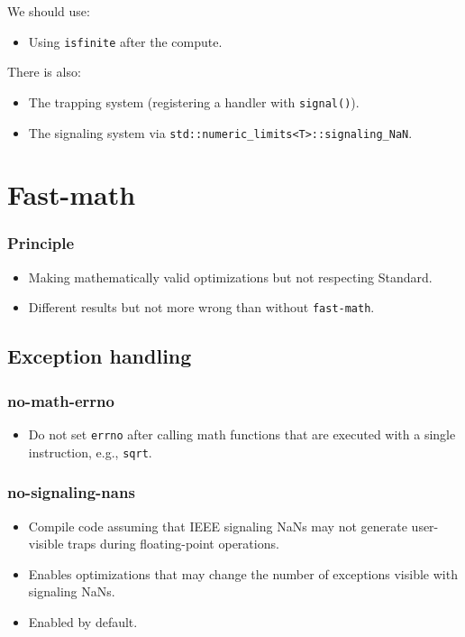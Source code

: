 \documentclass{beamer}
\begin{document}
\begin{frame}[fragile]
    We should use:
    \begin{itemize}
        \item Using \verb'isfinite' after the compute.
    \end{itemize}

    There is also:
    \begin{itemize}
        \item The trapping system (registering a handler with \verb'signal()').
        \item The signaling system via \verb'std::numeric_limits<T>::signaling_NaN'.
    \end{itemize}
\end{frame}

\section{Fast-math}

\begin{frame}
    \tableofcontents[currentsection]
\end{frame}

\begin{frame}[fragile]
    \frametitle{Principle}

    \begin{itemize}
        \item Making mathematically valid optimizations but not respecting Standard.
        \item Different results but not more wrong than without \verb'fast-math'.
    \end{itemize}
\end{frame}

\subsection{Exception handling}

\begin{frame}[fragile]
    \frametitle{no-math-errno}

    \begin{itemize}
        \item Do not set \verb'errno' after calling math functions that are executed with a single instruction, e.g., \verb'sqrt'.
    \end{itemize}
\end{frame}

\begin{frame}[fragile]
    \frametitle{no-signaling-nans}

    \begin{itemize}
        \item Compile code assuming that IEEE signaling NaNs may not generate user-visible traps during floating-point operations.
        \item Enables optimizations that may change the number of exceptions visible with signaling NaNs.
        \item Enabled by default.
    \end{itemize}
\end{frame}
\end{document}
